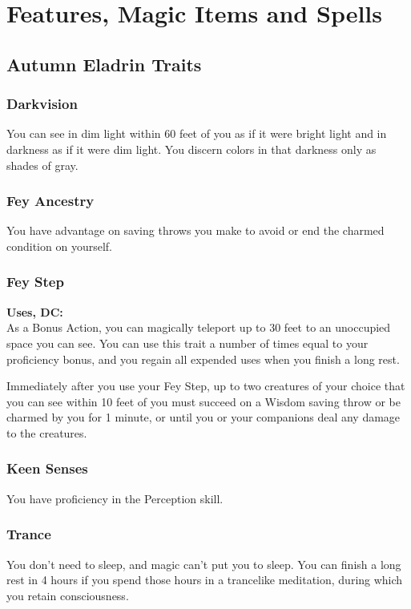 \documentclass[letterpaper,openany,oneside,twocolumn]{book}
\begin{document}
\onecolumn


\rendercharactersheet

\renderbackgroundsheet

\renderspellsheet


\restoregeometry
\twocolumn

\chapter*{Features, Magic Items and Spells}
\section*{Autumn Eladrin Traits}
\subsection*{Darkvision}
You can see in dim light within 60 feet of you as if it were bright light and in darkness as if it were dim light. You discern colors in that darkness only as shades of gray.
\subsection*{Fey Ancestry}
You have advantage on saving throws you make to avoid or end the charmed condition on yourself.
\subsection*{Fey Step}
\textbf{ Uses, DC: }\\
As a Bonus Action, you can magically teleport up to 30 feet to an unoccupied space you can see. You can use this trait a number of times equal to your proficiency bonus, and you regain all expended uses when you finish a long rest.

Immediately after you use your Fey Step, up to two creatures of your choice that you can see within 10 feet of you must succeed on a Wisdom saving throw or be charmed by you for 1 minute, or until you or your companions deal any damage to the creatures.
\subsection*{Keen Senses}
You have proficiency in the Perception skill.
\subsection*{Trance}
You don't need to sleep, and magic can't put you to sleep. You can finish a long rest in 4 hours if you spend those hours in a trancelike meditation, during which you retain consciousness.
\end{document}
